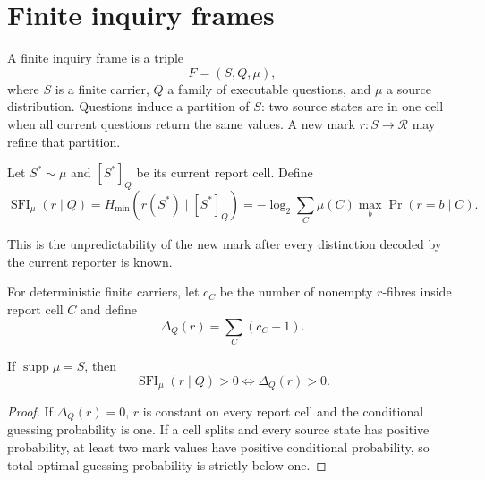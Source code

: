 \documentclass[11pt,a4paper]{article}
\begin{document}
\MakeResearchTitle
\MakeResearchContents
{}
\section{Finite inquiry frames}
A finite inquiry frame is a triple
\begin{equation}
F=(S,Q,\mu),
\end{equation}
where $S$ is a finite carrier, $Q$ a family of executable questions, and $\mu$ a source distribution. Questions induce a partition of $S$: two source states are in one cell when all current questions return the same values. A new mark $r:S\to\mathcal R$ may refine that partition.

\begin{definition}
Let $S^*\sim\mu$ and $[S^*]_Q$ be its current report cell. Define
\begin{equation}
\operatorname{SFI}_\mu(r\mid Q)
=H_{\min}(r(S^*)\mid [S^*]_Q)
=-\log_2\sum_C\mu(C)\max_b\Pr(r=b\mid C).
\end{equation}
\end{definition}
This is the unpredictability of the new mark after every distinction decoded by the current reporter is known.

For deterministic finite carriers, let $c_C$ be the number of nonempty $r$-fibres inside report cell $C$ and define
\begin{equation}
\Delta_Q(r)=\sum_C(c_C-1).
\end{equation}

\begin{theorem}
If $\operatorname{supp}\mu=S$, then
\begin{equation}
\boxed{\operatorname{SFI}_\mu(r\mid Q)>0\iff\Delta_Q(r)>0.}
\end{equation}
\end{theorem}
\begin{proof}
If $\Delta_Q(r)=0$, $r$ is constant on every report cell and the conditional guessing probability is one. If a cell splits and every source state has positive probability, at least two mark values have positive conditional probability, so total optimal guessing probability is strictly below one.
\end{proof}
\end{document}
